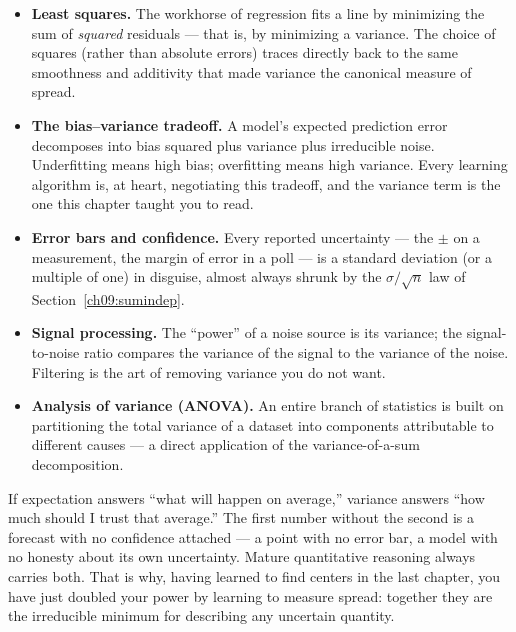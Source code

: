 \begin{itemize}
  \item \textbf{Least squares.} The workhorse of regression fits a line by
        minimizing the sum of \emph{squared} residuals --- that is, by
        minimizing a variance. The choice of squares (rather than absolute
        errors) traces directly back to the same smoothness and additivity
        that made variance the canonical measure of spread.
  \item \textbf{The bias--variance tradeoff.} A model's expected prediction
        error decomposes into bias squared plus variance plus irreducible
        noise. Underfitting means high bias; overfitting means high variance.
        Every learning algorithm is, at heart, negotiating this tradeoff, and
        the variance term is the one this chapter taught you to read.
  \item \textbf{Error bars and confidence.} Every reported uncertainty ---
        the $\pm$ on a measurement, the margin of error in a poll --- is a
        standard deviation (or a multiple of one) in disguise, almost always
        shrunk by the $\sigma/\sqrt n$ law of Section~\ref{ch09:sumindep}.
  \item \textbf{Signal processing.} The ``power'' of a noise source is its
        variance; the signal-to-noise ratio compares the variance of the
        signal to the variance of the noise. Filtering is the art of removing
        variance you do not want.
  \item \textbf{Analysis of variance (ANOVA).} An entire branch of statistics
        is built on partitioning the total variance of a dataset into
        components attributable to different causes --- a direct application
        of the variance-of-a-sum decomposition.
\end{itemize}

\begin{aestheticbox}
If expectation answers ``what will happen on average,'' variance answers ``how
much should I trust that average.'' The first number without the second is a
forecast with no confidence attached --- a point with no error bar, a model
with no honesty about its own uncertainty. Mature quantitative reasoning
always carries both. That is why, having learned to find centers in the last
chapter, you have just doubled your power by learning to measure spread:
together they are the irreducible minimum for describing any uncertain
quantity.
\end{aestheticbox}

